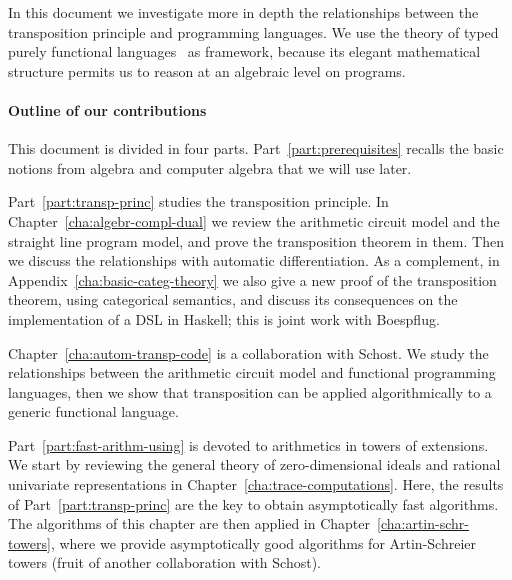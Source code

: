 In this document we investigate more in depth the relationships
between the transposition principle and programming languages. We use
the theory of typed purely functional languages~\cite{pierce} as
framework, because its elegant mathematical structure permits us to
reason at an algebraic level on programs.


\paragraph*{Outline of our contributions}
This document is divided in four parts. Part~\ref{part:prerequisites}
recalls the basic notions from algebra and computer algebra that we
will use later.

Part~\ref{part:transp-princ} studies the transposition principle. In
Chapter~\ref{cha:algebr-compl-dual} we review the arithmetic circuit
model and the straight line program model, and prove the transposition
theorem in them. Then we discuss the relationships with automatic
differentiation. As a complement, in
Appendix~\ref{cha:basic-categ-theory} we also give a new proof of the
transposition theorem, using categorical semantics, and discuss its
consequences on the implementation of a DSL in Haskell; this is joint
work with Boespflug.

Chapter~\ref{cha:autom-transp-code} is a collaboration with Schost. We
study the relationships between the arithmetic circuit model and
functional programming languages, then we show that transposition can
be applied algorithmically to a generic functional language. 

Part~\ref{part:fast-arithm-using} is devoted to arithmetics in towers
of extensions. We start by reviewing the general theory of
zero-dimensional ideals and rational univariate representations in
Chapter~\ref{cha:trace-computations}. Here, the results of
Part~\ref{part:transp-princ} are the key to obtain asymptotically fast
algorithms. The algorithms of this chapter are then applied in
Chapter~\ref{cha:artin-schr-towers}, where we provide asymptotically
good algorithms for Artin-Schreier towers (fruit of another
collaboration with Schost).

